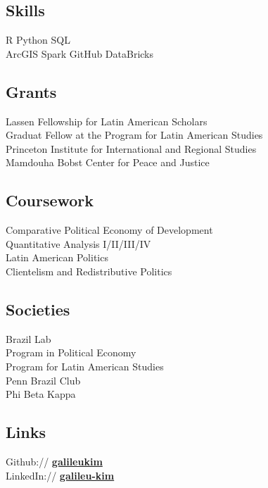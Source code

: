 \documentclass[]{deedy-resume-openfont}
\begin{document}
    

\subsection{Skills}
R \textbullet{} Python \textbullet{} SQL \textbullet{} \\
ArcGIS \textbullet{} Spark \textbullet{} GitHub \textbullet{} DataBricks \\

\sectionsep


\subsection{Grants}
\textbullet{} Lassen Fellowship for Latin American Scholars\\
\textbullet{} Graduat Fellow at the Program for Latin American Studies\\
\textbullet{} Princeton Institute for International and Regional Studies\\
\textbullet{} Mamdouha Bobst Center for Peace and Justice

\sectionsep


\subsection{Coursework}
\textbullet{} Comparative Political Economy of Development\\
\textbullet{} Quantitative Analysis I/II/III/IV\\
\textbullet{} Latin American Politics\\
\textbullet{} Clientelism and Redistributive Politics

\sectionsep


\subsection{Societies}
\textbullet{} Brazil Lab\\
\textbullet{} Program in Political Economy\\
\textbullet{} Program for Latin American Studies\\
\textbullet{} Penn Brazil Club\\
\textbullet{} Phi Beta Kappa
\sectionsep


\subsection{Links}
Github:// \href{https://github.com/galileukim}{\bf galileukim} \\
LinkedIn://  \href{https://www.linkedin.com/in/leu-kim}{\bf galileu-kim} \\
\sectionsep
\end{document}
